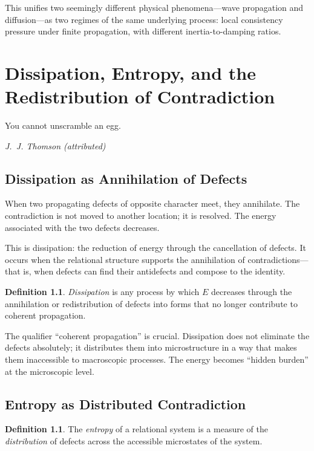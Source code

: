 \documentclass[12pt,a4paper,openany]{book}
\theoremstyle{plain}
\theoremstyle{definition}
\newtheorem{definition}[theorem]{Definition}
\theoremstyle{remark}
\newcommand{\Energy}{E}
\begin{document}
This unifies two seemingly different physical phenomena---wave propagation and diffusion---as two regimes of the same underlying process: local consistency pressure under finite propagation, with different inertia-to-damping ratios.

\chapter{Dissipation, Entropy, and the Redistribution of Contradiction}

\epigraph{%
  You cannot unscramble an egg.
}{%
  \textit{J.~J. Thomson (attributed)}}

\section{Dissipation as Annihilation of Defects}

When two propagating defects of opposite character meet, they annihilate. The contradiction is not moved to another location; it is resolved. The energy associated with the two defects decreases.

This is dissipation: the reduction of energy through the cancellation of defects. It occurs when the relational structure supports the annihilation of contradictions---that is, when defects can find their antidefects and compose to the identity.

\begin{definition}
\emph{Dissipation} is any process by which $\Energy$ decreases through the annihilation or redistribution of defects into forms that no longer contribute to coherent propagation.
\end{definition}

The qualifier ``coherent propagation'' is crucial. Dissipation does not eliminate the defects absolutely; it distributes them into microstructure in a way that makes them inaccessible to macroscopic processes. The energy becomes ``hidden burden'' at the microscopic level.

\section{Entropy as Distributed Contradiction}

\begin{definition}
The \emph{entropy} of a relational system is a measure of the \emph{distribution} of defects across the accessible microstates of the system.
\end{definition}
\end{document}
